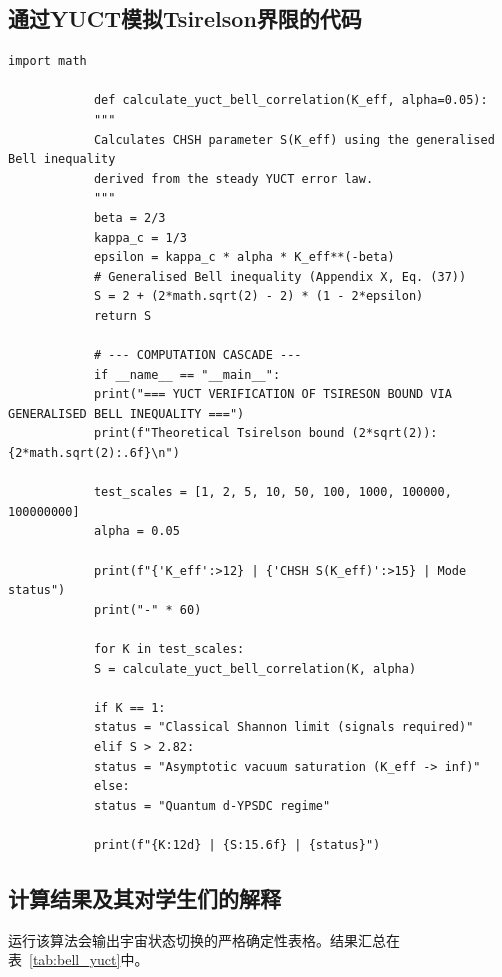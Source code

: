 \documentclass[12pt,a4paper]{article}
\begin{document}
	\subsection{通过YUCT模拟Tsirelson界限的代码}
	
	\begin{tcolorbox}[
		colback=gray!5, 
		colframe=black!75, 
		title=YUCT Python代码：通过广义贝尔不等式计算Tsirelson界限,
		fonttitle=\small\ttfamily,
		arc=2mm,
		fontupper=\scriptsize,
		left=1mm, right=1mm,
		top=1mm, bottom=1mm
		]
		\begin{lstlisting}[basicstyle=\scriptsize\ttfamily, breaklines=true, columns=fullflexible]
			import math
			
			def calculate_yuct_bell_correlation(K_eff, alpha=0.05):
			"""
			Calculates CHSH parameter S(K_eff) using the generalised Bell inequality
			derived from the steady YUCT error law.
			"""
			beta = 2/3
			kappa_c = 1/3
			epsilon = kappa_c * alpha * K_eff**(-beta)
			# Generalised Bell inequality (Appendix X, Eq. (37))
			S = 2 + (2*math.sqrt(2) - 2) * (1 - 2*epsilon)
			return S
			
			# --- COMPUTATION CASCADE ---
			if __name__ == "__main__":
			print("=== YUCT VERIFICATION OF TSIRESON BOUND VIA GENERALISED BELL INEQUALITY ===")
			print(f"Theoretical Tsirelson bound (2*sqrt(2)): {2*math.sqrt(2):.6f}\n")
			
			test_scales = [1, 2, 5, 10, 50, 100, 1000, 100000, 100000000]
			alpha = 0.05
			
			print(f"{'K_eff':>12} | {'CHSH S(K_eff)':>15} | Mode status")
			print("-" * 60)
			
			for K in test_scales:
			S = calculate_yuct_bell_correlation(K, alpha)
			
			if K == 1:
			status = "Classical Shannon limit (signals required)"
			elif S > 2.82:
			status = "Asymptotic vacuum saturation (K_eff -> inf)"
			else:
			status = "Quantum d-YPSDC regime"
			
			print(f"{K:12d} | {S:15.6f} | {status}")
		\end{lstlisting}
	\end{tcolorbox}
	
	\subsection{计算结果及其对学生们的解释}
	
	运行该算法会输出宇宙状态切换的严格确定性表格。结果汇总在表~\ref{tab:bell_yuct}中。
	
\end{document}
